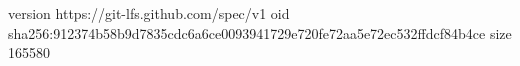 version https://git-lfs.github.com/spec/v1
oid sha256:912374b58b9d7835cdc6a6ce0093941729e720fe72aa5e72ec532ffdcf84b4ce
size 165580
